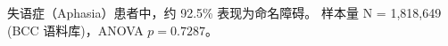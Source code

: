 \documentclass{ctexart}
\begin{document}
失语症（Aphasia）患者中，约 92.5\% 表现为命名障碍。
样本量 N = 1,818,649 (BCC 语料库)，ANOVA $p = 0.7287$。
\end{document}
